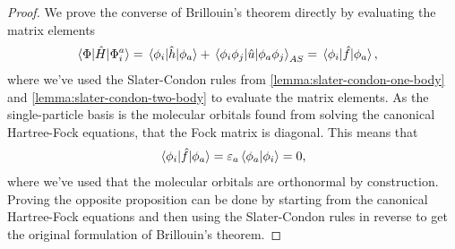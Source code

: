            \begin{proof}
                We prove the converse of Brillouin's theorem directly by
                evaluating the matrix elements
                \begin{align}
                    \mel*{\Phi}{\hat{H}}{\Phi^{a}_{i}}
                    &= \mel*{\phi_i}{\hat{h}}{\phi_a}
                    + \mel*{\phi_i\phi_j}{\hat{u}}{\phi_a\phi_j}_{AS}
                    = \mel*{\phi_i}{\hat{f}}{\phi_a},
                \end{align}
                where we've used the Slater-Condon rules from
                \autoref{lemma:slater-condon-one-body} and
                \autoref{lemma:slater-condon-two-body} to evaluate the matrix
                elements.
                As the single-particle basis is the molecular orbitals found
                from solving the canonical Hartree-Fock equations, that the Fock
                matrix is diagonal.
                This means that
                \begin{align}
                    \mel*{\phi_i}{\hat{f}}{\phi_a}
                    = \varepsilon_a\braket*{\phi_a}{\phi_i}
                    = 0,
                \end{align}
                where we've used that the molecular orbitals are orthonormal by
                construction.
                Proving the opposite proposition can be done by starting from
                the canonical Hartree-Fock equations and then using the
                Slater-Condon rules in reverse to get the original formulation
                of Brillouin's theorem.
            \end{proof}



